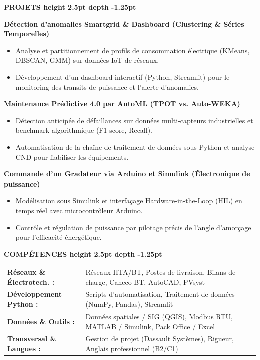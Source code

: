 \documentclass[10pt,a4paper]{altacv}
\renewcommand{\cvsection}[2][]{%
  \vspace{2.5pt}%
  {\color{heading}\Large\bfseries #2 \hspace{0.2em}\leaders\vrule height 2.5pt depth -1.25pt\hfill\mbox{}}\par\vspace{2pt}
}
\begin{document}
\cvsection{PROJETS}
{\normalsize\bfseries\color{accent} Détection d’anomalies Smartgrid \& Dashboard (Clustering \& Séries Temporelles)}\par\vspace{1pt}
\begin{itemize}[leftmargin=*, label=\textbullet, nosep, itemsep=1pt]
  \item Analyse et partitionnement de profils de consommation électrique (KMeans, DBSCAN, GMM) sur données IoT de réseaux.
  \item Développement d’un dashboard interactif (Python, Streamlit) pour le monitoring des transits de puissance et l'alerte d’anomalies.
\end{itemize}
\vspace{1pt}
{\normalsize\bfseries\color{accent} Maintenance Prédictive 4.0 par AutoML (TPOT vs. Auto-WEKA)}\par\vspace{1pt}
\begin{itemize}[leftmargin=*, label=\textbullet, nosep, itemsep=1pt]
  \item Détection anticipée de défaillances sur données multi-capteurs industrielles et benchmark algorithmique (F1-score, Recall).
  \item Automatisation de la chaîne de traitement de données sous Python et analyse CND pour fiabiliser les équipements.
\end{itemize}
\vspace{1pt}
{\normalsize\bfseries\color{accent} Commande d’un Gradateur via Arduino et Simulink (Électronique de puissance)}\par\vspace{1pt}
\begin{itemize}[leftmargin=*, label=\textbullet, nosep, itemsep=1pt]
  \item Modélisation sous Simulink et interfaçage Hardware-in-the-Loop (HIL) en temps réel avec microcontrôleur Arduino.
  \item Contrôle et régulation de puissance par pilotage précis de l’angle d’amorçage pour l'efficacité énergétique.
\end{itemize}

\cvsection{COMPÉTENCES}
\begin{tabular}{@{}ll@{}}
\textbf{Réseaux \& Électrotech. :} & Réseaux HTA/BT, Postes de livraison, Bilans de charge, Caneco BT, AutoCAD, PVsyst \\[1.5pt]
\textbf{Développement Python :} & Scripts d'automatisation, Traitement de données (NumPy, Pandas), Streamlit \\[1.5pt]
\textbf{Données \& Outils :} & Données spatiales / SIG (QGIS), Modbus RTU, MATLAB / Simulink, Pack Office / Excel \\[1.5pt]
\textbf{Transversal \& Langues :} & Gestion de projet (Dassault Systèmes), Rigueur, Anglais professionnel (B2/C1)
\end{tabular}
\end{document}

